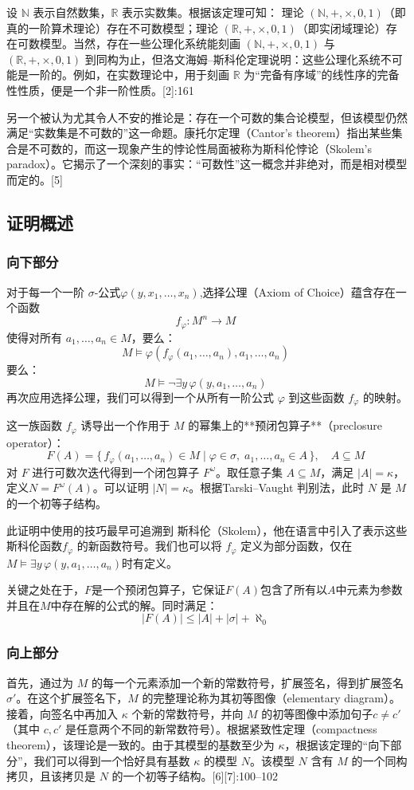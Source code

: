 设 \(\mathbb{N}\) 表示自然数集，\(\mathbb{R}\) 表示实数集。根据该定理可知：
理论 \((\mathbb{N}, +, \times, 0, 1)\)（即真的一阶算术理论）存在不可数模型；理论 \((\mathbb{R}, +, \times, 0, 1)\)（即实闭域理论）存在可数模型。当然，存在一些公理化系统能刻画 \((\mathbb{N}, +, \times, 0, 1)\) 与 \((\mathbb{R}, +, \times, 0, 1)\) 到同构为止，但洛文海姆–斯科伦定理说明：这些公理化系统不可能是一阶的。例如，在实数理论中，用于刻画 \(\mathbb{R}\) 为“完备有序域”的线性序的完备性性质，便是一个非一阶性质。[2]:161

另一个被认为尤其令人不安的推论是：存在一个可数的集合论模型，但该模型仍然满足“实数集是不可数的”这一命题。康托尔定理（Cantor’s theorem）指出某些集合是不可数的，而这一现象产生的悖论性局面被称为斯科伦悖论（Skolem’s paradox）。它揭示了一个深刻的事实：“可数性”这一概念并非绝对，而是相对模型而定的。[5]
\subsection{证明概述}
\subsubsection{向下部分}
对于每一个一阶 \(\sigma\)-公式\(\varphi(y, x_1, \ldots, x_n)\),选择公理（Axiom of Choice）蕴含存在一个函数  
\[
f_\varphi : M^n \to M~
\]
使得对所有 \(a_1, \ldots, a_n \in M\)，要么：
\[
M \models \varphi(f_\varphi(a_1, \ldots, a_n), a_1, \ldots, a_n)~
\]
要么：
\[
M \models \neg \exists y \, \varphi(y, a_1, \ldots, a_n)~
\]
再次应用选择公理，我们可以得到一个从所有一阶公式 \(\varphi\) 到这些函数 \(f_\varphi\) 的映射。

这一族函数 \(f_\varphi\) 诱导出一个作用于 \(M\) 的幂集上的**预闭包算子**（preclosure operator）：
\[
F(A) = \{\, f_\varphi(a_1, \ldots, a_n) \in M \mid 
\varphi \in \sigma, \; a_1, \ldots, a_n \in A \,\},
\quad A \subseteq M~
\]
对 \(F\) 进行可数次迭代得到一个闭包算子 \(F^\omega\)。取任意子集 \(A \subseteq M\)，满足 \(|A| = \kappa\)，定义\(N = F^\omega(A)\)。可以证明 \(|N| = \kappa\)。根据Tarski–Vaught 判别法，此时 \(N\) 是 \(M\) 的一个初等子结构。

此证明中使用的技巧最早可追溯到 斯科伦（Skolem），他在语言中引入了表示这些斯科伦函数\(f_\varphi\) 的新函数符号。我们也可以将 \(f_\varphi\) 定义为部分函数，仅在
\(M \models \exists y\, \varphi(y, a_1, \ldots, a_n)\)时有定义。  

关键之处在于，\(F\)是一个预闭包算子，它保证\(F(A)\)包含了所有以\(A\)中元素为参数并且在\(M\)中存在解的公式的解。同时满足：
\[
|F(A)| \le |A| + |\sigma| + \aleph_0~
\]
\subsubsection{向上部分}
首先，通过为 \(M\) 的每一个元素添加一个新的常数符号，扩展签名，得到扩展签名 \(\sigma'\)。在这个扩展签名下，\(M\) 的完整理论称为其初等图像（elementary diagram）。接着，向签名中再加入 \(\kappa\) 个新的常数符号，并向 \(M\) 的初等图像中添加句子\(c \neq c'\)（其中 \(c, c'\) 是任意两个不同的新常数符号）。根据紧致性定理（compactness theorem），该理论是一致的。由于其模型的基数至少为 \(\kappa\)，根据该定理的“向下部分”，我们可以得到一个恰好具有基数 \(\kappa\) 的模型 \(N\)。该模型 \(N\) 含有 \(M\) 的一个同构拷贝，且该拷贝是 \(N\) 的一个初等子结构。[6][7]:100–102

